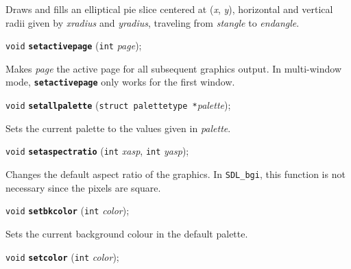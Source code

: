 \documentclass[a4paper,12pt]{article}
\newcommand{\SDLbgi}{\texttt{SDL\_bgi}}
\newcommand{\V}{\texttt{void}}      %
\newcommand{\I}{\texttt{int}}       %
\newcommand{\func}[1]{\textbf{\texttt{#1}}}  %
\newcommand{\A}[1]{\emph{#1}}       %
\newenvironment{bgi}
{ %
  \begin{snugshade}
}
{ %
  \end{snugshade}
}
\begin{document}
Draws and fills an elliptical pie slice centered at (\A{x}, \A{y}),
horizontal and vertical radii given by \A{xradius} and \A{yradius},
traveling from \A{stangle} to \A{endangle}.


\label{sec:setactivepage}

\begin{bgi}
\V{} \func{setactivepage} (\I{} \A{page});
\end{bgi}

Makes \A{page} the active page for all subsequent graphics output. In
multi-window mode, \func{setactivepage} only works for the first window.


\label{sec:setallpalette}

\begin{bgi}
\V{} \func{setallpalette} (\texttt{struct palettetype *}\A{palette});
\end{bgi}

Sets the current palette to the values given in \A{palette}.


\label{sec:setaspectratio}

\begin{bgi}
\V{} \func{setaspectratio} (\I{} \A{xasp}, \I{} \A{yasp});
\end{bgi}

Changes the default aspect ratio of the graphics. In \SDLbgi, this
function is not necessary since the pixels are square.


\label{sec:setbkcolor}

\begin{bgi}
\V{} \func{setbkcolor} (\I{} \A{color});
\end{bgi}

Sets the current background colour in the default palette.


\label{sec:setcolor}

\begin{bgi}
\V{} \func{setcolor} (\I{} \A{color});
\end{bgi}
\end{document}
